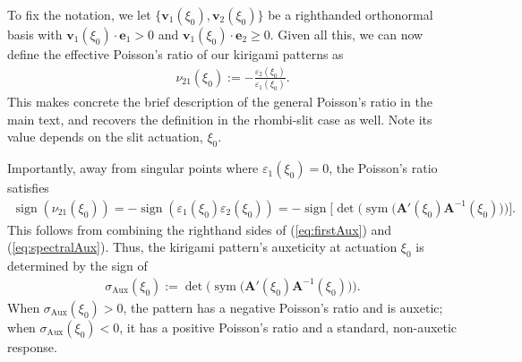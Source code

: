 \documentclass[aps,11pt,tightenlines,notitlepage,superscriptaddress,longbibliography,nofootinbib]{revtex4-1}
\DeclareMathOperator{\sign}{sign}
\DeclareMathOperator{\sym}{sym}
\begin{document}
To fix the notation, we let $\{\mathbf{v}_{1}(\xi_0), \mathbf{v}_{2}(\xi_0)\}$ be a righthanded orthonormal basis with $\mathbf{v}_1(\xi_0) \cdot \mathbf{e}_1 > 0$ and $\mathbf{v}_1(\xi_0) \cdot \mathbf{e}_2 \geq 0$.  
Given all this, we can now define the effective Poisson's ratio of our kirigami patterns as
\begin{equation}
    \begin{aligned}
    \nu_{21}(\xi_0) := - \frac{\varepsilon_2(\xi_0)}{\varepsilon_1(\xi_0)}.
    \end{aligned}
\end{equation}
This makes concrete the brief description of the general Poisson's ratio in the main text, and recovers the definition in the rhombi-slit case as well. Note its value depends on the slit actuation, $\xi_0$.  

Importantly, away from singular points where $\varepsilon_1(\xi_0) = 0$, the Poisson's ratio satisfies 
\begin{equation}
    \begin{aligned}
    \sign( \nu_{21}(\xi_0) ) = -\sign( \varepsilon_1(\xi_0) \varepsilon_2(\xi_0)) = -\sign\Big[\det \Big( \sym\big(\mathbf{A}'(\xi_0) \mathbf{A}^{-1}(\xi_0)\big) \Big) \Big].
    \end{aligned}
\end{equation}
This follows from combining the righthand sides of  (\ref{eq:firstAux}) and (\ref{eq:spectralAux}).  Thus, the kirigami pattern's auxeticity at actuation $\xi_0$ is determined by the sign of  
\begin{equation}
    \begin{aligned}\label{eq:sigmaAux}
    \sigma_{\text{Aux}}(\xi_0) := \det \Big( \sym\big(\mathbf{A}'(\xi_0) \mathbf{A}^{-1}(\xi_0)\big)\Big).
    \end{aligned}
\end{equation}
When $\sigma_{\text{Aux}}(\xi_0) > 0$, the pattern has a negative Poisson's ratio and is auxetic; when $\sigma_{\text{Aux}}(\xi_0) < 0$, it has a positive Poisson's ratio and a standard, non-auxetic response. %
\end{document}
